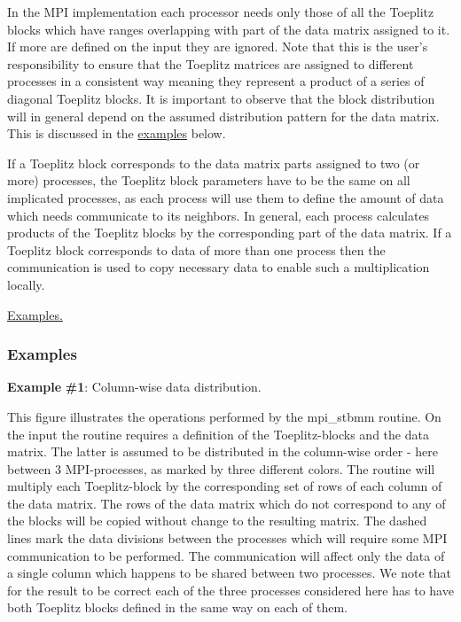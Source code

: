 In the M\-P\-I implementation each processor needs only those of all the Toeplitz blocks which have ranges overlapping with part of the data matrix assigned to it. If more are defined on the input they are ignored. Note that this is the user's responsibility to ensure that the Toeplitz matrices are assigned to different processes in a consistent way meaning they represent a product of a series of diagonal Toeplitz blocks. It is important to observe that the block distribution will in general depend on the assumed distribution pattern for the data matrix. This is discussed in the \hyperlink{toeplitz_funct_stbmm_examples}{examples} below.

If a Toeplitz block corresponds to the data matrix parts assigned to two (or more) processes, the Toeplitz block parameters have to be the same on all implicated processes, as each process will use them to define the amount of data which needs communicate to its neighbors. In general, each process calculates products of the Toeplitz blocks by the corresponding part of the data matrix. If a Toeplitz block corresponds to data of more than one process then the communication is used to copy necessary data to enable such a multiplication locally.

\hyperlink{toeplitz_funct_stbmm_examples}{Examples.} \hypertarget{toeplitz_funct_stbmm_examples}{}\subsubsection{Examples}\label{toeplitz_funct_stbmm_examples}
{\bfseries Example} {\bfseries \#1}\-: Column-\/wise data distribution.



This figure illustrates the operations performed by the {\ttfamily mpi\-\_\-stbmm} routine. On the input the routine requires a definition of the Toeplitz-\/blocks and the data matrix. The latter is assumed to be distributed in the column-\/wise order -\/ here between 3 M\-P\-I-\/processes, as marked by three different colors. The routine will multiply each Toeplitz-\/block by the corresponding set of rows of each column of the data matrix. The rows of the data matrix which do not correspond to any of the blocks will be copied without change to the resulting matrix. The dashed lines mark the data divisions between the processes which will require some M\-P\-I communication to be performed. The communication will affect only the data of a single column which happens to be shared between two processes. We note that for the result to be correct each of the three processes considered here has to have both Toeplitz blocks defined in the same way on each of them.


